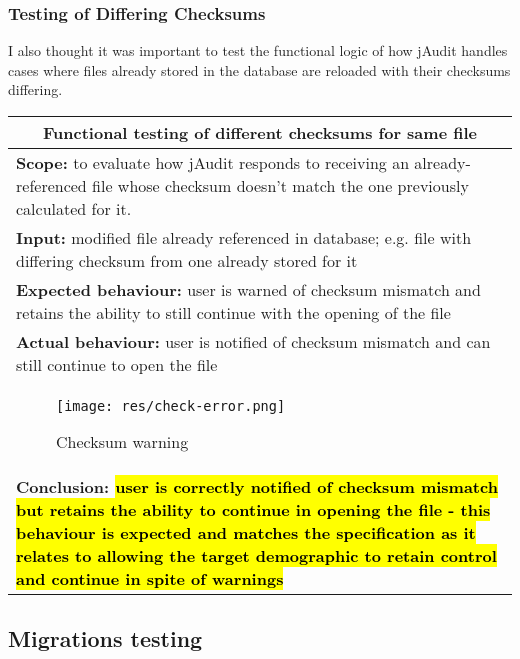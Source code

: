 \documentclass[9pt]{article}
\DeclareRobustCommand{\hlgreen}[1]{{\sethlcolor{green}\hl{#1}}}
\begin{document}
		\subsubsection{Testing of Differing Checksums}
			
			I also thought it was important to test the functional logic of how
			jAudit handles cases where files already stored in the database are
			reloaded with their checksums differing.

			\begin{center}
				\begin{tabular}{ |p{13cm}|  }
					\hline
					\multicolumn{2}{|c|}{Functional testing of different
					checksums for same file} \\
					\hline
						\textbf{Scope:} to evaluate how jAudit responds to
						receiving an already-referenced file whose checksum
						doesn't match the one previously calculated for it.\\
					\hline
						\textbf{Input:} modified file already referenced in
						database; e.g. file with differing checksum from one
						already stored for it\\
					\hline
						\textbf{Expected behaviour:} user is warned of checksum
						mismatch and retains the ability to still continue with
						the opening of the file\\
					\hline
						\textbf{Actual behaviour:} user is notified of checksum
						mismatch and can still continue to open the file \\
					\hline
					
						\begin{figure}[H]
							\centering
							\texttt{[image: res/check-error.png]}
							\caption{Checksum warning}
						\end{figure}

					\hline\\
						\textbf{Conclusion: \hlgreen{user is correctly notified
						of checksum mismatch but retains the ability to continue
						in opening the file - this behaviour is expected and
						matches the specification as it relates to allowing the
						target demographic to retain control and continue in
						spite of warnings} }\\
					\hline
				\end{tabular}
			\end{center}

	\subsection{Migrations testing}
	
\end{document}
